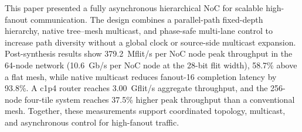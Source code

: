 \documentclass[conference]{IEEEtran}
\begin{document}
This paper presented a fully asynchronous hierarchical NoC for scalable
high-fanout communication. The design combines a parallel-path
fixed-depth hierarchy, native tree--mesh multicast, and phase-safe
multi-lane control to increase path diversity without a global clock or
source-side multicast expansion. Post-synthesis results show
379.2~Mflit/s per NoC node peak throughput in the 64-node network
(10.6~Gb/s per NoC node at the 28-bit flit width), 58.7\% above a flat mesh,
while native multicast
reduces fanout-16 completion latency
by 93.8\%. A c1p4 router reaches 3.00~Gflit/s aggregate throughput,
and the 256-node four-tile system reaches 37.5\% higher peak throughput
than a conventional mesh. Together, these measurements support
coordinated topology, multicast, and asynchronous control for high-fanout
traffic.

{\renewcommand{\footnotesize}{\fontsize{8}{9.2}\selectfont}


}
\end{document}
